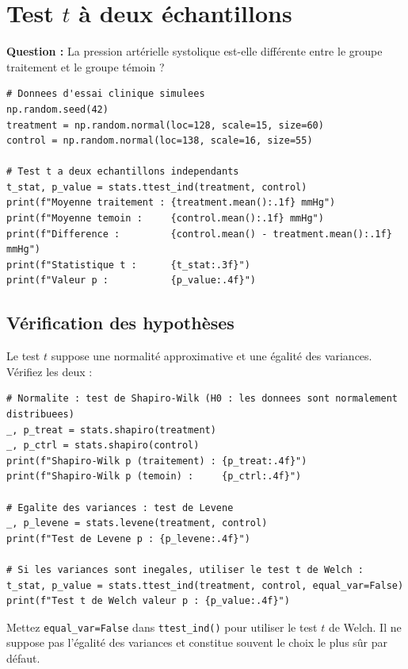 \section{Test $t$ \`a deux \'echantillons}

\textbf{Question :} La pression art\'erielle systolique est-elle diff\'erente entre le groupe traitement et le groupe t\'emoin ?

\begin{verbatim}
# Donnees d'essai clinique simulees
np.random.seed(42)
treatment = np.random.normal(loc=128, scale=15, size=60)
control = np.random.normal(loc=138, scale=16, size=55)

# Test t a deux echantillons independants
t_stat, p_value = stats.ttest_ind(treatment, control)
print(f"Moyenne traitement : {treatment.mean():.1f} mmHg")
print(f"Moyenne temoin :     {control.mean():.1f} mmHg")
print(f"Difference :         {control.mean() - treatment.mean():.1f} mmHg")
print(f"Statistique t :      {t_stat:.3f}")
print(f"Valeur p :           {p_value:.4f}")
\end{verbatim}

\subsection{V\'erification des hypoth\`eses}

Le test $t$ suppose une normalit\'e approximative et une \'egalit\'e des variances. V\'erifiez les deux :

\begin{verbatim}
# Normalite : test de Shapiro-Wilk (H0 : les donnees sont normalement distribuees)
_, p_treat = stats.shapiro(treatment)
_, p_ctrl = stats.shapiro(control)
print(f"Shapiro-Wilk p (traitement) : {p_treat:.4f}")
print(f"Shapiro-Wilk p (temoin) :     {p_ctrl:.4f}")

# Egalite des variances : test de Levene
_, p_levene = stats.levene(treatment, control)
print(f"Test de Levene p : {p_levene:.4f}")

# Si les variances sont inegales, utiliser le test t de Welch :
t_stat, p_value = stats.ttest_ind(treatment, control, equal_var=False)
print(f"Test t de Welch valeur p : {p_value:.4f}")
\end{verbatim}

\begin{pythontip}
Mettez \texttt{equal\_var=False} dans \texttt{ttest\_ind()} pour utiliser le test $t$ de Welch. Il ne suppose pas l'\'egalit\'e des variances et constitue souvent le choix le plus s\^ur par d\'efaut.
\end{pythontip}


